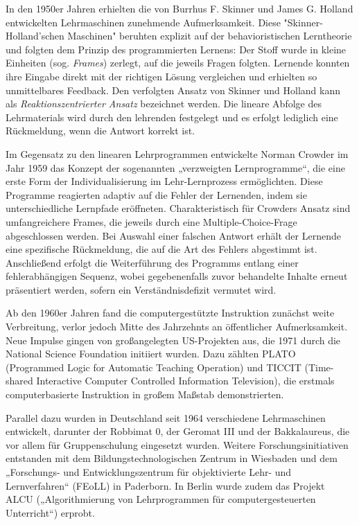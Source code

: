 In den 1950er Jahren erhielten die von Burrhus F. Skinner und James G. Holland entwickelten Lehrmaschinen zunehmende Aufmerksamkeit. Diese "Skinner-Holland’schen Maschinen" beruhten explizit auf der behavioristischen Lerntheorie und folgten dem Prinzip des programmierten Lernens: Der Stoff wurde in kleine Einheiten (sog. \textit{Frames}) zerlegt, auf die jeweils Fragen folgten. Lernende konnten ihre Eingabe direkt mit der richtigen Lösung vergleichen und erhielten so unmittelbares Feedback.\parencite[S.~970--977]{skinner_teaching_1958} Den verfolgten Ansatz von Skinner und Holland kann als \textit{Reaktionszentrierter Ansatz} bezeichnet werden. Die lineare Abfolge des Lehrmaterials wird durch den lehrenden festgelegt und es erfolgt lediglich eine Rückmeldung, wenn die Antwort korrekt ist.

Im Gegensatz zu den linearen Lehrprogrammen entwickelte Norman Crowder im Jahr 1959 das Konzept der sogenannten „verzweigten Lernprogramme“, die eine erste Form der Individualisierung im Lehr-Lernprozess ermöglichten. Diese Programme reagierten adaptiv auf die Fehler der Lernenden, indem sie unterschiedliche Lernpfade eröffneten. Charakteristisch für Crowders Ansatz sind umfangreichere Frames, die jeweils durch eine Multiple-Choice-Frage abgeschlossen werden. Bei Auswahl einer falschen Antwort erhält der Lernende eine spezifische Rückmeldung, die auf die Art des Fehlers abgestimmt ist. Anschließend erfolgt die Weiterführung des Programms entlang einer fehlerabhängigen Sequenz, wobei gegebenenfalls zuvor behandelte Inhalte erneut präsentiert werden, sofern ein Verständnisdefizit vermutet wird.\parencite[S. 252 - 254]{crowder_differences_1963}\parencite[S. 9]{schonfeld_computerbasiertes_2006}


Ab den 1960er Jahren fand die computergestützte Instruktion zunächst weite Verbreitung, verlor jedoch Mitte des Jahrzehnts an öffentlicher Aufmerksamkeit. Neue Impulse gingen von großangelegten US-Projekten aus, die 1971 durch die National Science Foundation initiiert wurden. Dazu zählten PLATO (Programmed Logic for Automatic Teaching Operation) und TICCIT (Time-shared Interactive Computer Controlled Information Television), die erstmals computerbasierte Instruktion in großem Maßstab demonstrierten.

Parallel dazu wurden in Deutschland seit 1964 verschiedene Lehrmaschinen entwickelt, darunter der Robbimat 0, der Geromat III und der Bakkalaureus, die vor allem für Gruppenschulung eingesetzt wurden. Weitere Forschungsinitiativen entstanden mit dem Bildungstechnologischen Zentrum in Wiesbaden und dem „Forschungs- und Entwicklungszentrum für objektivierte Lehr- und Lernverfahren“ (FEoLL) in Paderborn. In Berlin wurde zudem das Projekt ALCU („Algorithmierung von Lehrprogrammen für computergesteuerten Unterricht“) erprobt.

